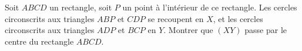Soit $ABCD$ un rectangle, soit $P$ un point à l'intérieur de ce rectangle. Les cercles circonscrits aux triangles $ABP$ et $CDP$ se recoupent en $X$, et les cercles circonscrits aux triangles $ADP$ et $BCP$ en $Y$. Montrer que $(XY)$ passe par le centre du rectangle $ABCD$.